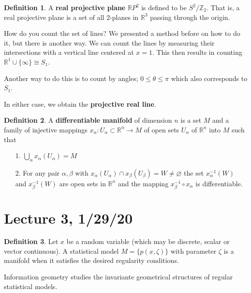 \documentclass[12pt,letterpaper,boxed]{maths_v5}
\newcommand{\zz}{\mathbb{Z}}
\newcommand{\rr}{\mathbb{R}}
\theoremstyle{definition}
\newtheorem{definition}{Definition}[section]
\begin{document}
    \begin{definition}
        A \textbf{real projective plane} $\rr P^2$ is defined to be 
        $S^2/\zz_2$. That is, a real projective plane is a set of all 
        2-planes in $\rr^3$ passing through the origin. 
    \end{definition}

    \begin{example}
        How do you count the set of lines? We presented a method before on how to do it, but there 
        is another way. We can count the lines by measuring their intersections with a vertical 
        line centered at $x = 1$. This then results in counting $\rr^1 \cup \{\infty\} \cong S_1$. 

        Another way to do this is to count by angles; $0 \le \theta \le \pi$ which 
        also corresponds to $S_1$.
        
        In either case, we obtain  the \textbf{projective real line}.
    \end{example}

    \begin{definition}
        A \textbf{differentiable manifold} of dimension $n$ is a set $M$ 
        and a family of injective mappings $x_\alpha: U_\alpha \subset \rr^n \to M$ 
        of open sets $U_\alpha$ of $\rr^n$ into $M$ such that 
        \begin{itemize}
            \item[1.] $\displaystyle \bigcup_{\alpha} x_\alpha(U_\alpha) = M$ 
            \item[2.] For any pair $\alpha, \beta$ with $x_\alpha(U_\alpha) \cap x_\beta(U_\beta) = W \ne \varnothing$ 
            the set $x_\alpha^{-1}(W)$ and $x_\beta^{-1}(W)$ are open sets in $\rr^n$ 
            and the mapping $x_\beta^{-1}\circ x_\alpha$ is differentiable. 
        \end{itemize}
    \end{definition}

    \section*{Lecture 3, 1/29/20}
    \begin{definition}
        Let $x$ be a random variable (which may be discrete, scalar or vector continuous). 
        A statistical model $M =  \{p(x, \zeta)\}$ with parameter $\zeta$ 
        is a manifold when it satisfies the desired regularity conditions. 
    \end{definition}
    Information geometry studies the invariante geometrical structures of regular statistical 
    models. 
\end{document}

